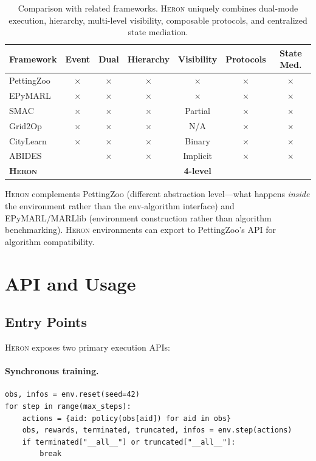 \documentclass{article}
\newcommand{\heron}{\textsc{Heron}}
\newcommand{\cmark}{\checkmark}
\newcommand{\xmark}{$\times$}
\begin{document}
\begin{table}[t]
\centering
\caption{Comparison with related frameworks. \heron{} uniquely combines dual-mode execution, hierarchy, multi-level visibility, composable protocols, and centralized state mediation.}
\label{tab:comparison}
\small
\begin{tabular}{@{}lcccccc@{}}
\toprule
\textbf{Framework} & \textbf{Event} & \textbf{Dual} & \textbf{Hierarchy} & \textbf{Visibility} & \textbf{Protocols} & \textbf{State Med.} \\
\midrule
PettingZoo & \xmark & \xmark & \xmark & \xmark & \xmark & \xmark \\
EPyMARL & \xmark & \xmark & \xmark & \xmark & \xmark & \xmark \\
SMAC & \xmark & \xmark & \xmark & Partial & \xmark & \xmark \\
Grid2Op & \xmark & \xmark & \xmark & N/A & \xmark & \xmark \\
CityLearn & \xmark & \xmark & \xmark & Binary & \xmark & \xmark \\
ABIDES & \cmark & \xmark & \xmark & Implicit & \xmark & \xmark \\
\midrule
\textbf{\heron{}} & \cmark & \cmark & \cmark & \textbf{4-level} & \cmark & \cmark \\
\bottomrule
\end{tabular}
\end{table}

\heron{} complements PettingZoo (different abstraction level---what happens \emph{inside} the environment rather than the env-algorithm interface) and EPyMARL/MARLlib (environment construction rather than algorithm benchmarking). \heron{} environments can export to PettingZoo's API for algorithm compatibility.

\section{API and Usage}
\label{sec:api}

\subsection{Entry Points}

\heron{} exposes two primary execution APIs:

\paragraph{Synchronous training.}
\begin{lstlisting}
obs, infos = env.reset(seed=42)
for step in range(max_steps):
    actions = {aid: policy(obs[aid]) for aid in obs}
    obs, rewards, terminated, truncated, infos = env.step(actions)
    if terminated["__all__"] or truncated["__all__"]:
        break
\end{lstlisting}
\end{document}
